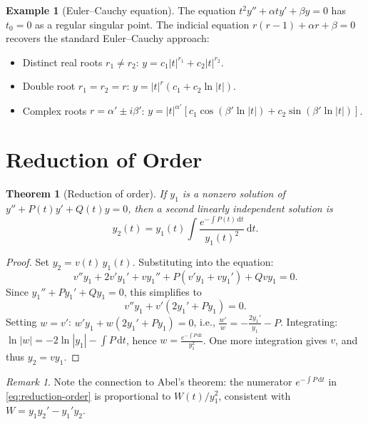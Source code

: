 \documentclass[12pt,a4paper,openany]{book}
\theoremstyle{definition}
\newtheorem{example}[definition]{Example}
\theoremstyle{plain}
\newtheorem{theorem}[definition]{Theorem}
\theoremstyle{remark}
\newtheorem{remark}[definition]{Remark}
\newcommand{\dd}{\mathrm{d}}
\newcommand{\abs}[1]{\left|#1\right|}
\begin{document}
\begin{example}[Euler--Cauchy equation]\label{ex:euler-cauchy-frobenius}
The equation $t^2y''+\alpha ty'+\beta y=0$ has $t_0=0$ as a regular
singular point.  The indicial equation $r(r-1)+\alpha r+\beta=0$
recovers the standard Euler--Cauchy approach:
\begin{itemize}
  \item Distinct real roots $r_1\neq r_2$:
    $y=c_1\abs{t}^{r_1}+c_2\abs{t}^{r_2}$.
  \item Double root $r_1=r_2=r$: $y=\abs{t}^r(c_1+c_2\ln\abs{t})$.
  \item Complex roots $r=\alpha'\pm i\beta'$:
    $y=\abs{t}^{\alpha'}[c_1\cos(\beta'\ln\abs{t})+c_2\sin(\beta'\ln\abs{t})]$.
\end{itemize}
\end{example}

\section{Reduction of Order}\label{sec:reduction-order}

\begin{theorem}[Reduction of order]\label{thm:reduction-order}
If $y_1$ is a nonzero solution of $y''+P(t)y'+Q(t)y=0$, then a
second linearly independent solution is
\begin{equation}\label{eq:reduction-order}
  y_2(t) = y_1(t)\int\frac{e^{-\int P(t)\,\dd t}}{y_1(t)^2}\,\dd t.
\end{equation}
\end{theorem}

\begin{proof}
Set $y_2=v(t)\,y_1(t)$.  Substituting into the equation:
\[
  v''y_1 + 2v'y_1' + vy_1'' + P(v'y_1+vy_1') + Qvy_1 = 0.
\]
Since $y_1''+Py_1'+Qy_1=0$, this simplifies to
\[
  v''y_1 + v'(2y_1'+Py_1) = 0.
\]
Setting $w=v'$: $w'y_1 + w(2y_1'+Py_1)=0$, i.e.,
$\frac{w'}{w} = -\frac{2y_1'}{y_1}-P$.
Integrating: $\ln\abs{w} = -2\ln\abs{y_1}-\int P\,\dd t$, hence
$w = \frac{e^{-\int P\,\dd t}}{y_1^2}$.
One more integration gives $v$, and thus $y_2=vy_1$.
\end{proof}

\begin{remark}\label{rem:reduction-wronskian}
Note the connection to Abel's theorem: the numerator
$e^{-\int P\,\dd t}$ in \eqref{eq:reduction-order} is proportional to
$W(t)/y_1^2$, consistent with $W=y_1y_2'-y_1'y_2$.
\end{remark}
\end{document}
